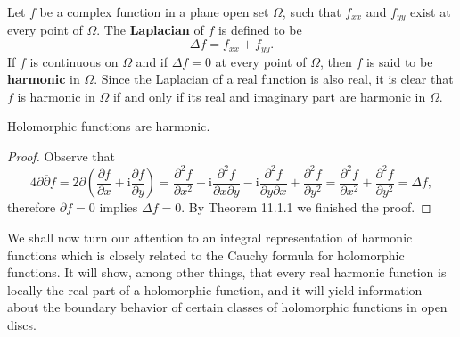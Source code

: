 Let $f$ be a complex function in a plane open set $\Omega$, such that $f_{xx}$ and $f_{yy}$ exist at every point of $\Omega$. The \textbf{Laplacian} of $f$ is defined to be 
$$\Delta f=f_{xx}+f_{yy}.$$
If $f$ is continuous on $\Omega$ and if $\Delta f=0$ at every point of $\Omega$, then $f$ is said to be \textbf{harmonic} in $\Omega$. Since the Laplacian of a real function is also real, it is clear that $f$ is harmonic in $\Omega$ if and only if its real and imaginary part are harmonic in $\Omega$.\par
\begin{proposition}
Holomorphic functions are harmonic.
\end{proposition}
\begin{proof}
Observe that 
$$
4\partial \overline{\partial }f=2\partial \left( \frac{\partial f}{\partial x}+\mathrm{i}\frac{\partial f}{\partial y} \right) =\frac{\partial ^2f}{\partial x^2}+\mathrm{i}\frac{\partial ^2f}{\partial x\partial y}-\mathrm{i}\frac{\partial ^2f}{\partial y\partial x}+\frac{\partial ^2f}{\partial y^2}=\frac{\partial ^2f}{\partial x^2}+\frac{\partial ^2f}{\partial y^2}=\Delta f,
$$
therefore $\overline{\partial}f=0$ implies $\Delta f=0$. By Theorem 11.1.1 we finished the proof.
\end{proof}
We shall now turn our attention to an integral representation of harmonic functions which is closely related to the Cauchy formula for holomorphic functions. It will show, among other things, that every real harmonic function is locally the real part of a holomorphic function, and it will yield information about the boundary behavior of certain classes of holomorphic functions in open discs.

